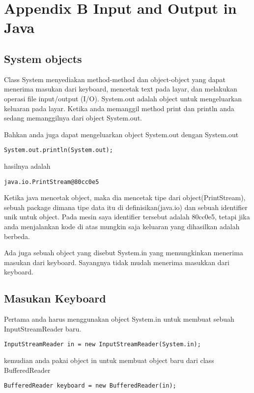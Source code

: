 \chapter{Appendix B Input and Output in Java}
\section{System objects} %
Class System menyediakan method-method dan object-object yang dapat menerima masukan dari keyboard, mencetak text pada layar, dan melakukan operasi file input/output (I/O). System.out adalah object untuk mengeluarkan keluaran pada layar. Ketika anda memanggil method print dan println anda sedang memanggilnya dari object System.out.

Bahkan anda juga dapat mengeluarkan object System.out dengan System.out

\begin{lstlisting}
System.out.println(System.out);
\end{lstlisting}

hasilnya adalah
\begin{lstlisting}
java.io.PrintStream@80cc0e5
\end{lstlisting}

Ketika java mencetak object, maka dia mencetak tipe dari object(PrintStream), sebuah package dimana tipe data itu di definisikan(java.io) dan sebuah identifier unik untuk object. Pada mesin saya identifier tersebut adalah 80cc0e5, tetapi jika anda menjalankan kode di atas mungkin saja keluaran yang dihasilkan adalah berbeda.

Ada juga sebuah object yang disebut System.in yang memungkinkan menerima masukan dari keyboard. Sayangnya tidak mudah menerima masukkan dari keyboard.

\section{Masukan Keyboard}
Pertama anda harus menggunakan object System.in untuk membuat sebuah InputStreamReader baru.

\begin{lstlisting}
InputStreamReader in = new InputStreamReader(System.in);
\end{lstlisting}

kemudian anda pakai object in untuk membuat object baru dari class BufferedReader
\begin{lstlisting}
BufferedReader keyboard = new BufferedReader(in);
\end{lstlisting}

